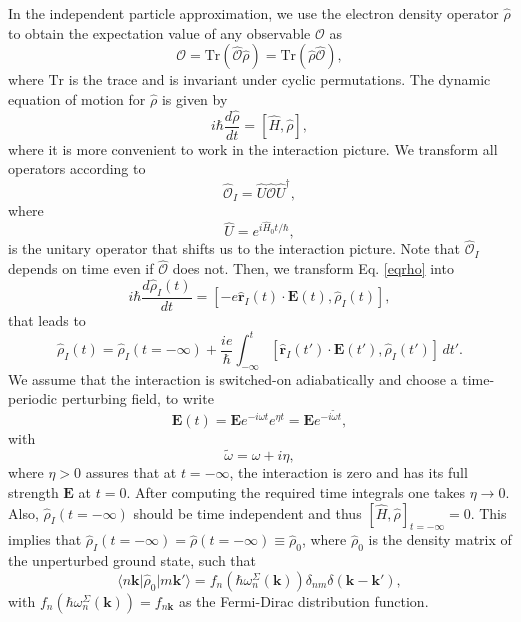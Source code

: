 In the independent particle approximation, we use the electron density operator
$\hat{\rho}$ to obtain the expectation value of any observable $\mathcal{O}$ as
\begin{equation}\label{traza}
\mathcal{O}
= \mathrm{Tr}(\hat{\mathcal{O}}\hat{\rho})
= \mathrm{Tr}(\hat{\rho}\hat{\mathcal{O}}),
\end{equation}
where $\mathrm{Tr}$ is the trace and is invariant under cyclic permutations.
The dynamic equation of motion for $\hat{\rho}$ is given by
\begin{equation}\label{eqrho}
i\hbar \frac{d\hat{\rho}}{dt} = \left[\hat{H},\hat{\rho}\right],
\end{equation}
where it is more convenient to work in the interaction picture. We transform all
operators according to
\begin{equation}\label{ip}
\hat{\mathcal{O}}_{I} = \hat{U}\hat{\mathcal{O}}\hat{U}^{\dagger},
\end{equation}
where
\begin{equation}\label{ou}
\hat{U} = e^{i\hat{H}_{0}t/\hbar},
\end{equation}
is the unitary operator that shifts us to the interaction picture. Note that
$\hat{\mathcal{O}}_{I}$ depends on time even if $\hat{\mathcal{O}}$ does not.
Then, we transform Eq. \eqref{eqrho} into
\begin{equation}\label{intrho}
i\hbar\frac{d\hat{\rho}_{I}(t)}{dt}
= \left[-e\hat{\mathbf{r}}_{I}(t)\cdot\mathbf{E}(t),\hat{\rho}_{I}(t)\right],
\end{equation}
that leads to
\begin{equation}\label{intrho2}
\hat{\rho}_{I}(t)
= \hat{\rho}_{I}(t = -\infty)
+ \frac{ie}{\hbar}\int_{-\infty}^{t}
  \left[\hat{\mathbf{r}}_{I}(t')\cdot\mathbf{E}(t'),\hat{\rho}_{I}(t')\right]
   \,dt'.
\end{equation}
We assume that the interaction is switched-on adiabatically and choose a
time-periodic perturbing field, to write
\begin{equation}\label{efield}
\mathbf{E}(t)
= \mathbf{E} e^{-i\omega t}e^{\eta t}
= \mathbf{E} e^{-i\tilde{\omega} t},
\end{equation}
with
\begin{equation}\label{got}
\tilde{\omega} =\omega + i\eta,
\end{equation} 
where $\eta > 0$ assures that at $t = -\infty$, the interaction is zero and has
its full strength $\mathbf{E}$ at $t = 0$. After computing the required time
integrals one takes $\eta\to 0$. Also, $\hat{\rho}_{I}(t = -\infty)$ should be
time independent and thus $[\hat{H},\hat{\rho}]_{t = -\infty} = 0$. This implies
that $\hat{\rho}_{I}(t = -\infty) = \hat{\rho}(t =
-\infty)\equiv\hat{\rho}_{0}$, where $\hat{\rho}_{0}$ is the density matrix of
the unperturbed ground state, such that
\begin{equation}\label{nrhon}
\langle n\mathbf{k}\vert \hat{\rho}_{0} \vert m\mathbf{k}'\rangle
= f_{n}(\hbar\omega^{\Sigma}_{n}(\mathbf{k}))
\delta_{nm}\delta(\mathbf{k}-\mathbf{k}'),
\end{equation}
with $f_{n}(\hbar\omega^{\Sigma}_{n}(\mathbf{k})) = f_{n\mathbf{k}}$ as the
Fermi-Dirac distribution function.

